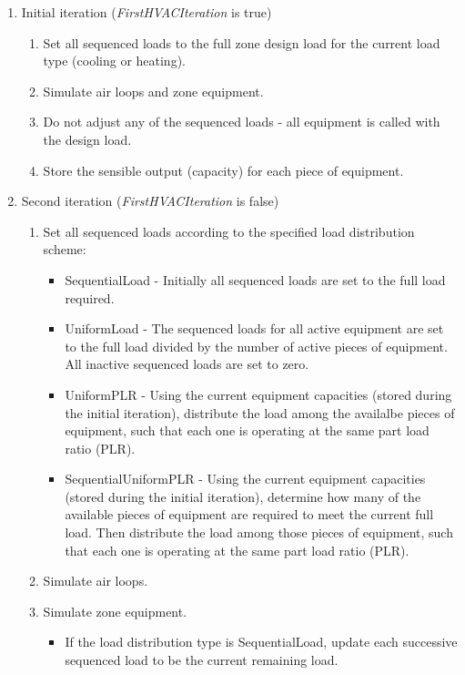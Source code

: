 \begin{enumerate}
\item
  Initial iteration (\emph{FirstHVACIteration} is true)
  \begin{enumerate}
  \item
    Set all sequenced loads to the full zone design load for the current load type (cooling or heating).
  \item
    Simulate air loops and zone equipment.
  \item
    Do not adjust any of the sequenced loads - all equipment is called with the design load.
  \item
    Store the sensible output (capacity) for each piece of equipment.
  \end{enumerate}
\item
  Second iteration (\emph{FirstHVACIteration} is false)
  \begin{enumerate}
  \item
    Set all sequenced loads according to the specified load distribution scheme:
    \begin{itemize}
    \item
      SequentialLoad - Initially all sequenced loads are set to the full load required.
    \item
      UniformLoad - The sequenced loads for all active equipment are set to the full load divided by the number of active pieces of equipment. All inactive sequenced loads are set to zero.
    \item
      UniformPLR - Using the current equipment capacities (stored during the initial iteration), distribute the load among the availalbe pieces of equipment, such that each one is operating at the same part load ratio (PLR).
    \item
      SequentialUniformPLR - Using the current equipment capacities (stored during the initial iteration), determine how many of the available pieces of equipment are required to meet the current full load.  Then distribute the load among those pieces of equipment, such that each one is operating at the same part load ratio (PLR).
    \end{itemize}
  \item
    Simulate air loops.
  \item
    Simulate zone equipment.
    \begin{itemize}
    \item
      If the load distribution type is SequentialLoad, update each successive sequenced load to be the current remaining load. 

\end{itemize}
\end{enumerate}
\end{enumerate}
